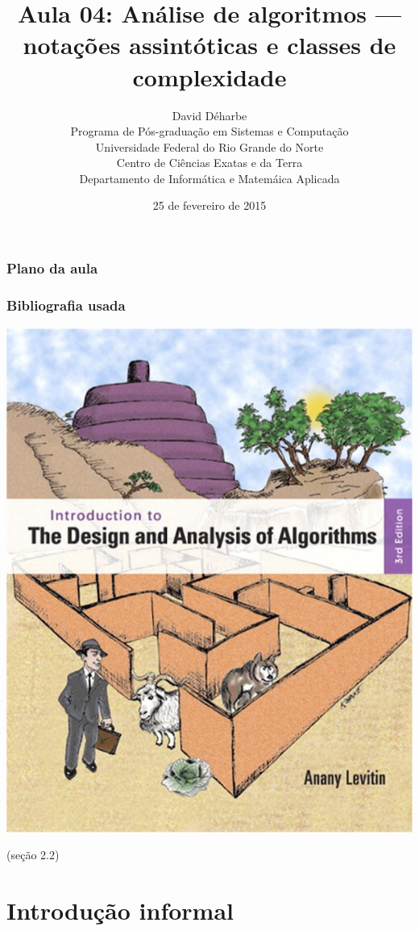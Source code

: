 \documentclass{beamer}
\title{Aula 04: Análise de algoritmos --- notações assintóticas e classes de complexidade}
\author{David Déharbe \\
  Programa de Pós-graduação em Sistemas e Computação \\
  Universidade Federal do Rio Grande do Norte \\
  Centro de Ciências Exatas e da Terra \\
  Departamento de Informática e Matemáica Aplicada}
\date{25 de fevereiro de 2015}
\begin{document}

\begin{frame}
  \titlepage
\end{frame}

\begin{frame}
  \frametitle{Plano da aula}
  \tableofcontents
\end{frame}

\begin{frame}

  \frametitle{Bibliografia usada}

  \begin{center}
    \includegraphics[height=.8\textheight]{../img/capa-levitin.jpg}
  \end{center}
  (seção 2.2)
\end{frame}


\section{Introdução informal}
\end{document}
